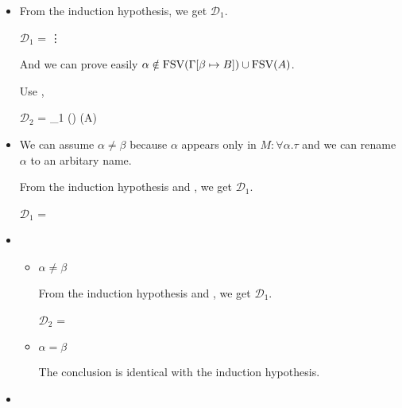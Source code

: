 \begin{itemize}
	\item \TGen
	      	      
	      From the induction hypothesis, we get $\mathcal{D}_1$.
	      	      
	      $\mathcal{D}_1$ = 
	      {\vdots}
	      	      
	      And we can prove easily $\alpha \notin \text{FSV}(\Gamma[\beta \mapsto B]) \cup \text{FSV}(A)$.
	      	      
	      Use \TGen,
	      	      
	      $\mathcal{D}_2$ = 
	      {_1 \andalso \alpha \notin \FTV(\GG) \cup \FTV(A)}
	      	      
	\item \TIns
	      	      
	      We can assume $\alpha \neq \beta$ because $\alpha$ appears only in $M:\forall\alpha.\tau$ and we can rename $\alpha$ to an arbitary name.
	      	      
	      From the induction hypothesis and \TIns, we get $\mathcal{D}_1$.
	      	      
	      $\mathcal{D}_1$ = 
	      {}
	      	      
	\item \TCsp
	      	      
	      \begin{itemize}
	      		      	
	      	\item $\alpha \neq \beta$
	      	      	      	      
	      	      From the induction hypothesis and \TCsp, we get $\mathcal{D}_1$.
	      	      	      	      
	      	      $\mathcal{D}_2$ = 
	      	      {}
	      	      	      	      
	      	\item $\alpha = \beta$
	      	      	      	      
	      	      The conclusion is identical with the induction hypothesis.
	      	      	      	      
	      \end{itemize}
	      	      
	\item \QKAbs
	      	      

\end{itemize}
